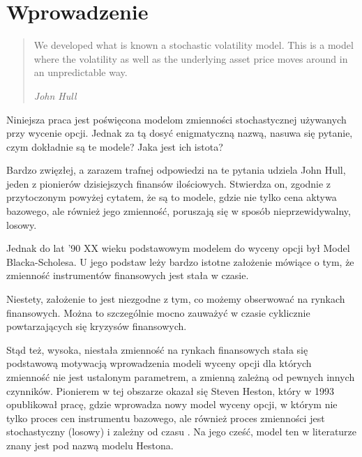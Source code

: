 \documentclass{pracamgr}
\begin{document}
\tableofcontents
 



\chapter{Wprowadzenie}
\label{chap:introduction}
\begin{quote}

  We developed what is known a stochastic volatility model. 
  This is a model where the volatility as well as the 
  underlying asset price moves around in an unpredictable way.

\raggedleft\slshape John Hull 
\end{quote}
Niniejsza praca jest poświęcona modelom zmienności stochastycznej używanych przy wycenie opcji. 
Jednak za tą dosyć enigmatyczną nazwą, nasuwa się pytanie, czym dokładnie są te modele? 
Jaka jest ich istota?

Bardzo zwięzłej, a zarazem trafnej odpowiedzi na te pytania udziela John Hull, 
jeden z pionierów dzisiejszych finansów ilościowych. Stwierdza on, zgodnie z przytoczonym 
powyżej cytatem, że są to modele, gdzie nie tylko cena aktywa bazowego, ale również jego zmienność, 
poruszają się w sposób nieprzewidywalny, losowy. 

Jednak do lat '90 XX wieku podstawowym modelem do wyceny opcji był Model Blacka-Scholesa. U jego podstaw 
leży bardzo istotne założenie mówiące o tym, że zmienność instrumentów finansowych jest stała w czasie. 

Niestety, założenie to jest niezgodne z tym, co możemy obserwować na rynkach finansowych. Można to szczególnie mocno zauważyć w czasie cyklicznie powtarzających się kryzysów finansowych.

Stąd też, wysoka, niestała zmienność na rynkach finansowych stała się podstawową motywacją wprowadzenia modeli wyceny
opcji dla których zmienność nie jest ustalonym parametrem, a zmienną zależną od pewnych innych czynników. 
Pionierem w tej obszarze okazał się Steven Heston, który w 1993 opublikował pracę, gdzie wprowadza
nowy model wyceny opcji, w którym nie tylko proces cen instrumentu bazowego, ale również
proces zmienności jest stochastyczny (losowy) i zależny od czasu \cite{Heston}. Na jego cześć, model ten 
w literaturze znany jest pod nazwą modelu Hestona.
\end{document}
